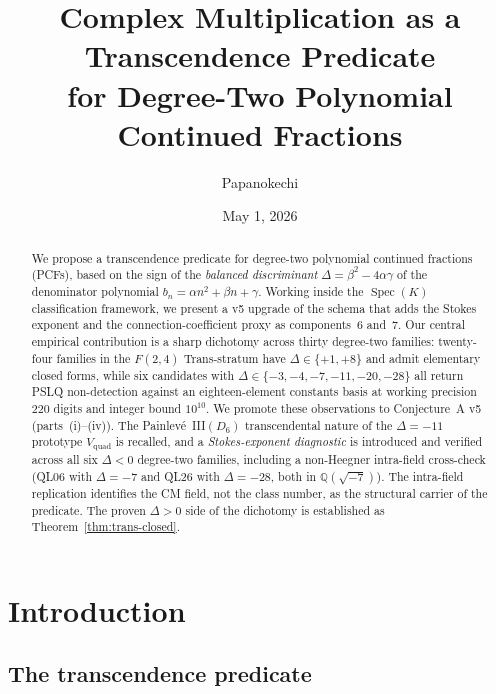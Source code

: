 \documentclass[11pt,reqno]{amsart}
\title[CM Predicate for Degree-2 PCFs]%
{Complex Multiplication as a Transcendence Predicate\\
for Degree-Two Polynomial Continued Fractions}
\author{Papanokechi}
\date{May 1, 2026}
\theoremstyle{definition}
\DeclareMathOperator{\Spec}{Spec}
\begin{document}
\begin{abstract}
We propose a transcendence predicate for degree-two polynomial
continued fractions (PCFs), based on the sign of the
\emph{balanced discriminant}
$\Delta = \beta^{2} - 4\alpha\gamma$ of the denominator polynomial
$b_{n} = \alpha n^{2} + \beta n + \gamma$. Working inside the
$\Spec(K)$ classification framework, we present a v5 upgrade of
the schema that adds the Stokes exponent and the
connection-coefficient proxy as components~6 and~7. Our central
empirical contribution is a sharp dichotomy across thirty
degree-two families: twenty-four families in the $F(2,4)$
Trans-stratum have $\Delta\in\{+1,+8\}$ and admit elementary
closed forms, while six candidates with
$\Delta\in\{-3,-4,-7,-11,-20,-28\}$ all return PSLQ non-detection
against an eighteen-element constants basis at working precision
$220$ digits and integer bound $10^{10}$. We promote these
observations to Conjecture~A v5 (parts~(i)--(iv)). The
Painlev\'e~III$(D_{6})$ transcendental nature of the
$\Delta=-11$ prototype $V_{\mathrm{quad}}$ is recalled, and a
\emph{Stokes-exponent diagnostic} is introduced and verified
across all six $\Delta<0$ degree-two families, including a
non-Heegner intra-field cross-check (QL06 with $\Delta=-7$
and QL26 with $\Delta=-28$, both in $\mathbb{Q}(\sqrt{-7})$).
The intra-field replication identifies the CM field, not the
class number, as the structural carrier of the predicate.
The proven $\Delta>0$ side of the dichotomy is established as
Theorem~\ref{thm:trans-closed}.
\end{abstract}

\maketitle

\section{Introduction}\label{sec:intro}

\subsection{The transcendence predicate}
\label{ssec:predicate}
\end{document}
